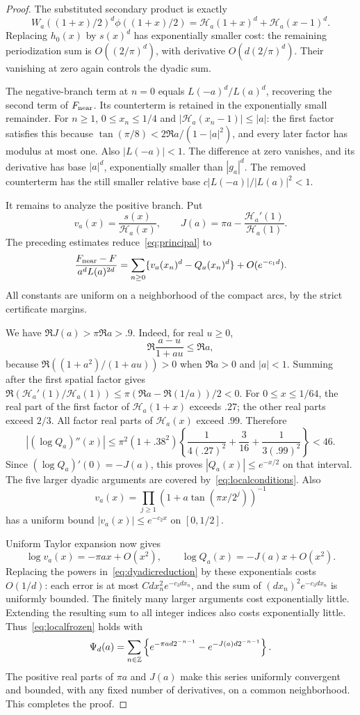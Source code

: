 \documentclass[11pt,a4paper]{article}
\theoremstyle{remark}\newtheorem*{ednote}{Editorial note (ProveIt, 2026-10-01)}
\newcommand{\HH}{\mathcal H}\newcommand{\GG}{\mathcal G}
\begin{document}
\begin{proof}
The substituted secondary product is exactly
\[
 W_a((1+x)/2)^d\phi((1+x)/2)
 =\HH_a(1+x)^d+\HH_a(x-1)^d.
\]
Replacing $h_0(x)$ by $s(x)^d$ has exponentially smaller cost: the remaining periodization sum is $O((2/\pi)^d)$, with derivative $O(d(2/\pi)^d)$. Their vanishing at zero again controls the dyadic sum.

The negative-branch term at $n=0$ equals $L(-a)^d/L(a)^d$, recovering the second term of $F_{\rm near}$. Its counterterm is retained in the exponentially small remainder. For $n\ge1$, $0\le x_n\le1/4$ and
$|\HH_a(x_n-1)|\le|a|$: the first factor satisfies this because
$\tan(\pi/8)<2\Re a/(1-|a|^2)$, and every later factor has modulus at most one. Also $|L(-a)|<1$. The difference at zero vanishes, and its derivative has base $|a|^d$, exponentially smaller than $|g_a|^d$. The removed counterterm has the still smaller relative base $c|L(-a)|/|L(a)|^2<1$.

It remains to analyze the positive branch. Put
\[
 v_a(x)=\frac{s(x)}{\HH_a(x)},\qquad
 J(a)=\pi a-\frac{\HH_a'(1)}{\HH_a(1)}.
\]
The preceding estimates reduce~\eqref{eq:principal} to
\begin{equation}\label{eq:dyadicreduction}
 \frac{F_{\rm near}-F}{a^dL(a)^{2d}}
 =\sum_{n\ge0}\{v_a(x_n)^d-Q_a(x_n)^d\}+O(e^{-c_1d}).
\end{equation}
All constants are uniform on a neighborhood of the compact arcs, by the strict certificate margins.

We have $\Re J(a)>\pi\Re a>.9$. Indeed, for real $u\ge0$,
\[
 \Re\frac{a-u}{1+au}\le\Re a,
\]
because $\Re((1+a^2)/(1+au))>0$ when $\Re a>0$ and $|a|<1$. Summing after the first spatial factor gives
$\Re(\HH_a'(1)/\HH_a(1))\le\pi(\Re a-\Re(1/a))/2<0$.
For $0\le x\le1/64$, the real part of the first factor of $\HH_a(1+x)$ exceeds $.27$; the other real parts exceed $2/3$. All factor real parts of $\HH_a(x)$ exceed $.99$. Therefore
\[
 |(\log Q_a)''(x)|
 \le\pi^2(1+.38^2)
 \left\{\frac1{4(.27)^2}+\frac3{16}+\frac1{3(.99)^2}\right\}<46.
\]
Since $(\log Q_a)'(0)=-J(a)$, this proves $|Q_a(x)|\le e^{-x/2}$ on that interval. The five larger dyadic arguments are covered by~\eqref{eq:localconditions}. Also
\[
 v_a(x)=\prod_{j\ge1}(1+a\tan(\pi x/2^j))^{-1}
\]
has a uniform bound $|v_a(x)|\le e^{-c_2x}$ on $[0,1/2]$.

Uniform Taylor expansion now gives
\[
 \log v_a(x)=-\pi ax+O(x^2),\qquad
 \log Q_a(x)=-J(a)x+O(x^2).
\]
Replacing the powers in~\eqref{eq:dyadicreduction} by these exponentials costs $O(1/d)$: each error is at most $Cd x_n^2e^{-c_3dx_n}$, and the sum of $(dx_n)^2e^{-c_3dx_n}$ is uniformly bounded. The finitely many larger arguments cost exponentially little. Extending the resulting sum to all integer indices also costs exponentially little. Thus~\eqref{eq:localfrozen} holds with
\begin{equation}\label{eq:Psi}
 \Psi_d(a)=\sum_{n\in\mathbb Z}
 \left\{e^{-\pi ad2^{-n-1}}-e^{-J(a)d2^{-n-1}}\right\}.
\end{equation}
The positive real parts of $\pi a$ and $J(a)$ make this series uniformly convergent and bounded, with any fixed number of derivatives, on a common neighborhood. This completes the proof.
\end{proof}
\end{document}

